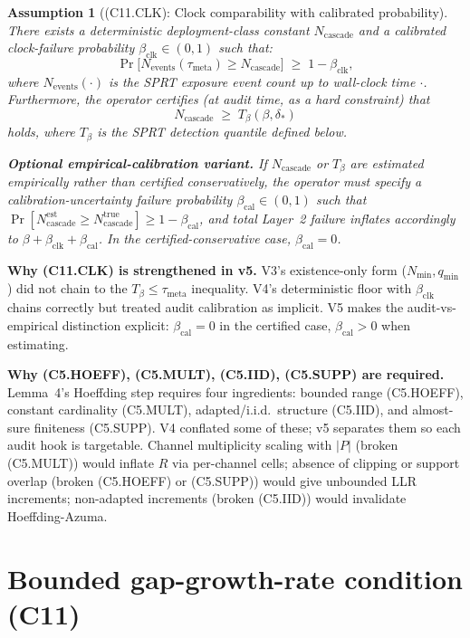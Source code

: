 \documentclass{article}
\newtheorem{assumption}{Assumption}
\newcommand{\deltastar}{\delta_{*}}
\newcommand{\Tbeta}{T_{\beta}}
\newcommand{\Ncasc}{N_{\mathrm{cascade}}}
\newcommand{\Nev}{N_{\mathrm{events}}}
\newcommand{\bclk}{\beta_{\mathrm{clk}}}
\newcommand{\bcal}{\beta_{\mathrm{cal}}}
\begin{document}
\begin{assumption}[(C11.CLK): Clock comparability with calibrated probability]
\label{ass:C11CLK}
There exists a deterministic deployment-class constant $\Ncasc$ and
a calibrated clock-failure probability $\bclk \in (0,1)$ such that:
\[
  \Pr\bigl[\Nev(\tau_{\mathrm{meta}}) \geq \Ncasc\bigr] \;\geq\;
  1 - \bclk,
\]
where $\Nev(\cdot)$ is the SPRT exposure event count up to wall-clock
time $\cdot$.  Furthermore, the operator certifies (at audit time, as
a \emph{hard} constraint) that
\[
  \Ncasc \;\geq\; \Tbeta(\beta, \deltastar)
\]
holds, where $\Tbeta$ is the SPRT detection quantile defined below.

\textbf{Optional empirical-calibration variant.}  If $\Ncasc$ or
$\Tbeta$ are estimated empirically rather than certified
conservatively, the operator must specify a calibration-uncertainty
failure probability $\bcal \in (0,1)$ such that
$\Pr[\Ncasc^{\mathrm{est}} \geq \Ncasc^{\mathrm{true}}] \geq 1 - \bcal$,
and total Layer~2 failure inflates accordingly to $\beta + \bclk +
\bcal$.  In the certified-conservative case, $\bcal = 0$.
\end{assumption}

\textbf{Why (C11.CLK) is strengthened in v5.}  V3's existence-only
form ($N_{\min}, q_{\min}$) did not chain to the
$\Tbeta \leq \tau_{\mathrm{meta}}$ inequality.  V4's deterministic
floor with $\bclk$ chains correctly but treated audit calibration
as implicit.  V5 makes the audit-vs-empirical distinction explicit:
$\bcal = 0$ in the certified case, $\bcal > 0$ when estimating.

\textbf{Why (C5.HOEFF), (C5.MULT), (C5.IID), (C5.SUPP) are
required.}  Lemma~4's Hoeffding step requires four ingredients:
bounded range (C5.HOEFF), constant cardinality (C5.MULT),
adapted/i.i.d.\ structure (C5.IID), and almost-sure finiteness
(C5.SUPP).  V4 conflated some of these; v5 separates them so each
audit hook is targetable.  Channel multiplicity scaling with $|P|$
(broken (C5.MULT)) would inflate $R$ via per-channel cells; absence
of clipping or support overlap (broken (C5.HOEFF) or (C5.SUPP))
would give unbounded LLR increments; non-adapted increments (broken
(C5.IID)) would invalidate Hoeffding-Azuma.

\section{Bounded gap-growth-rate condition (C11)}
\end{document}
